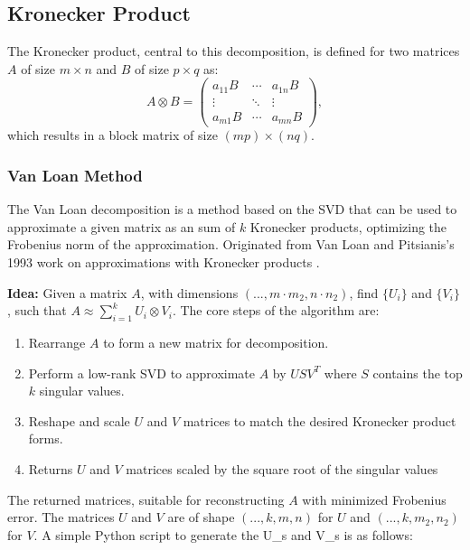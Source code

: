 \documentclass{article}
\begin{document}
{\subsection{Kronecker Product}

The Kronecker product, central to this decomposition, is defined for two matrices \( A \) of size \( m \times n \) and \( B \) of size \( p \times q \) as:
\begin{equation}
    A \otimes B = 
    \begin{pmatrix}
    a_{11}B & \cdots & a_{1n}B \\
    \vdots & \ddots & \vdots \\
    a_{m1}B & \cdots & a_{mn}B
    \end{pmatrix},
\end{equation}
which results in a block matrix of size \( (mp) \times (nq) \).

\subsubsection{Van Loan Method}%
\label{sub:The fuck is Van Loan}

The Van Loan decomposition is a method based on the SVD that can be used to approximate a given matrix as an sum of \( k \) Kronecker products, optimizing the Frobenius norm of the approximation. Originated from Van Loan and Pitsianis's 1993 work on approximations with Kronecker products \cite{van1993approximation}. 

\textbf{Idea:} Given a matrix \( A \), with dimensions \((..., m \cdot m_2, n \cdot n_2)\), find  \(\{ U_i\}\) and \( \{V_i\} \), such that \( A \approx \sum_{i=1}^k U_i \otimes V_i \). The core steps of the algorithm are:

\begin{enumerate}
    \item Rearrange \( A \) to form a new matrix for decomposition.
    \item Perform a low-rank SVD to approximate \( A \) by \( U S V^T \) where \( S \) contains the top \( k \) singular values.
    \item Reshape and scale \( U \) and \( V \) matrices to match the desired Kronecker product forms.
	\item Returns \( U \) and \( V \) matrices scaled by the square root of the singular values
\end{enumerate}

The returned matrices, suitable for reconstructing \( A \) with minimized Frobenius error. The matrices \( U \) and \( V \) are of shape \( (..., k, m, n) \) for \( U \) and \( (..., k, m_2, n_2) \) for \( V \). A simple Python script to generate the U_s and V_s is as follows:


}
\end{document}

